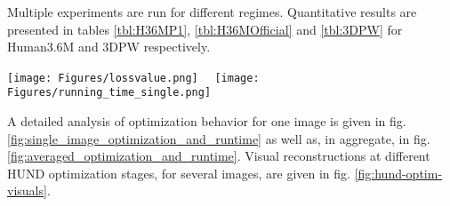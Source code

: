 \documentclass[final]{cvpr}
\makeatletter
\DeclareRobustCommand\onedot{\futurelet\@let@token\@onedot}
\def\@onedot{\ifx\@let@token.\else.\null\fi\xspace}
\def\eg{\emph{e.g}\onedot} \def\Eg{\emph{E.g}\onedot}
\makeatother
\begin{document}
 Multiple experiments are run for different regimes. Quantitative results are presented in tables \ref{tbl:H36MP1}, \ref{tbl:H36MOfficial} and \ref{tbl:3DPW} for Human3.6M and 3DPW respectively.
\begin{figure*}[!htbp]
\vspace{-4mm}
\begin{center}
    \texttt{[image: Figures/lossvalue.png]}~~
    \texttt{[image: Figures/running\_time\_single.png]}
\end{center}
\vspace{-3mm}
\caption{Behavior of different optimization methods including standard non-linear gradient-based BFGS, HUND(5), as well as variants of HUND, initializing BFGS, in order to assess progress and the quality of solutions obtained along the way (left). Corresponding cumulative run-times are shown on the right. Observe that HUND produces a good quality solution orders of magnitude faster than gradient descent (note log-scales on both plots). End refinement using gradient descent improves results, although we do not recommend a hybrid approach--- here we only show different hybrids for insight. This shows one optimization trace for a model initialized in A-pose and estimated given one image from Human3.6M, but such behavior is typical of aggregates, see \eg, fig. \ref{fig:averaged_optimization_and_runtime}. See also fig. \ref{fig:hund-optim-visuals} for visual illustrations of different configurations sampled by HUND during optimization.}
\label{fig:single_image_optimization_and_runtime}
\end{figure*}
A detailed analysis of optimization behavior for one image is given in fig. \ref{fig:single_image_optimization_and_runtime} as well as, in aggregate, in fig. \ref{fig:averaged_optimization_and_runtime}. Visual reconstructions at different HUND optimization stages, for several images, are given in fig. \ref{fig:hund-optim-visuals}. 
\end{document}
